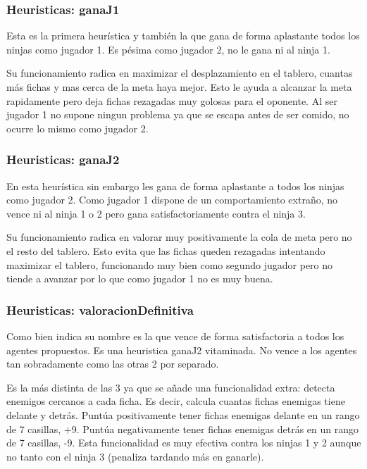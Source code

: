 \documentclass[12pt, spanish]{article}
\begin{document}
\subsubsection{Heuristicas: ganaJ1}
Esta es la primera heurística y también la que gana de forma aplastante todos los ninjas como jugador 1. Es pésima como jugador 2, no le gana ni al ninja 1.

Su funcionamiento radica en maximizar el desplazamiento en el tablero, cuantas más fichas y mas cerca de la meta haya mejor. Esto le ayuda a alcanzar la meta rapidamente pero deja fichas rezagadas muy golosas para el oponente. Al ser jugador 1 no supone ningun problema ya que se escapa antes de ser comido, no ocurre lo mismo como jugador 2.

\subsubsection{Heuristicas: ganaJ2}
En esta heurística sin embargo les gana de forma aplastante a todos los ninjas como jugador 2. Como jugador 1 dispone de un comportamiento extraño, no vence ni al ninja 1 o 2 pero gana satisfactoriamente contra el ninja 3.

Su funcionamiento radica en valorar muy positivamente la cola de meta pero no el resto del tablero. Esto evita que las fichas queden rezagadas intentando maximizar el tablero, funcionando muy bien como segundo jugador pero no tiende a avanzar por lo que como jugador 1 no es muy buena.

\subsubsection{Heuristicas: valoracionDefinitiva}
Como bien indica su nombre es la que vence de forma satisfactoria a todos los agentes propuestos. Es una heuristica ganaJ2 vitaminada. No vence a los agentes tan sobradamente como las otras 2 por separado.

Es la más distinta de las 3 ya que se añade una funcionalidad extra: detecta enemigos cercanos a cada ficha. Es decir, calcula cuantas fichas enemigas tiene delante y detrás. Puntúa positivamente tener fichas enemigas delante en un rango de 7 casillas, +9. Puntúa negativamente tener fichas enemigas detrás en un rango de 7 casillas, -9. Esta funcionalidad es muy efectiva contra los ninjas 1 y 2 aunque no tanto con el ninja 3 (penaliza tardando más en ganarle).
\end{document}
